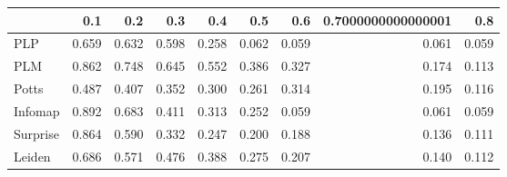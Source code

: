 \begin{tabular}{lrrrrrrrr}
\toprule
{} &   0.1 &   0.2 &   0.3 &   0.4 &   0.5 &   0.6 & 0.7000000000000001 &   0.8 \\
\midrule
PLP      & 0.659 & 0.632 & 0.598 & 0.258 & 0.062 & 0.059 &              0.061 & 0.059 \\
PLM      & 0.862 & 0.748 & 0.645 & 0.552 & 0.386 & 0.327 &              0.174 & 0.113 \\
Potts    & 0.487 & 0.407 & 0.352 & 0.300 & 0.261 & 0.314 &              0.195 & 0.116 \\
Infomap  & 0.892 & 0.683 & 0.411 & 0.313 & 0.252 & 0.059 &              0.061 & 0.059 \\
Surprise & 0.864 & 0.590 & 0.332 & 0.247 & 0.200 & 0.188 &              0.136 & 0.111 \\
Leiden   & 0.686 & 0.571 & 0.476 & 0.388 & 0.275 & 0.207 &              0.140 & 0.112 \\
\bottomrule
\end{tabular}
